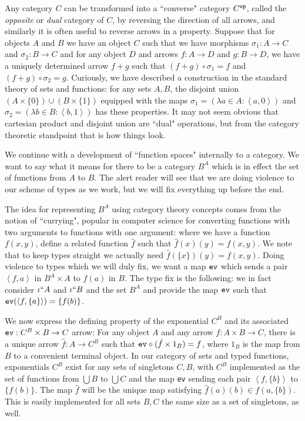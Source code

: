 \documentclass[12pt]{book}
\begin{document}
Any category $C$ can be transformed into a ``converse" category $C^{\tt op}$, called the {\em opposite\/} or {\em dual\/} category of $C$, by reversing the direction of all arrows, and similarly it is often useful to reverse arrows in a property.  Suppose that for objects $A$ and $B$ we have an object $C$ such that we have morphisms $\sigma_1:A \rightarrow C$ and $\sigma_2:B \rightarrow C$ and for any object $D$ and arrows $f:A \rightarrow D$ and $g:B \rightarrow D$, we have a uniquely determined arrow $f+g$ such that
$(f+g) \circ \sigma_1=f$ and $(f+g) \circ \sigma_2=g$.  Curiously, we have described a construction in the standard theory of sets and functions:
for any sets $A,B$, the disjoint union $(A \times \{0\}) \cup (B \times \{1\})$ equipped with the maps $\sigma_1 = (\lambda a \in A:\left<a,0\right>)$
and  $\sigma_2 = (\lambda b \in B:\left<b,1\right>)$ has these properties.  It may not seem obvious that cartesian product and disjoint union are ``dual" operations, but from the category theoretic standpoint that is how things look.

We continue with a development of ``function spaces" internally to a category.  We want to say what it means for there to be a category $B^A$ which
is in effect the set of functions from $A$ to $B$.  The alert reader will see that we are doing violence to our scheme of types as we work, but we will fix everything up before the end.

The idea for representing $B^A$ using category theory concepts comes from the notion of ``currying", popular in computer science for converting
functions with two arguments to functions with one argument:  where we have a function $f(x,y)$, define a related function $\hat{f}$ such that
$\hat{f}(x)(y)=f(x,y)$.  We note that to keep types straight we actually need $\hat{f}(\{x\})(y)=f(x,y)$.   Doing violence to types which we will duly fix, we want a map ${\tt ev}$ which sends a pair $\left<f,a\right>$ in $B^A \times A$ to $f(a)$ in $B$.  The type fix is the following:  we in fact
consider $\iota``A$ and $\iota``B$ and the set $B^A$ and  provide the map ${\tt ev}$ such that ${\tt ev}(\left<f,\{a\}\right>) = \{f(b)\}$.

We now express the defining property of the exponential $C^B$ and its associated ${\tt ev}:C^B \times B \rightarrow C$ arrow:  For any object $A$ and any arrow $f:A \times B \rightarrow C$, there is a unique arrow $\hat{f}: A \rightarrow C^B$ such that ${\tt ev} \circ (\hat{f} \times 1_B) = f$, where $1_B$ is the map from $B$ to a convenient terminal object.  In our category of sets and typed functions, exponentials $C^B$ exist for any sets of singletons $C,B$, with $C^B$ implemented as the set of functions from $\bigcup B$ to $\bigcup C$ and the map {\tt ev} sending each pair $\left<f,\{b\}\right>$ to $\{f(b)\}$.  The map $\hat{f}$ will be the unique map satisfying $\hat{f}(a) (b)  \in f(a,\{b\})$.  This is easily implemented for all sets  $B,C$ the same size as a set of singletons, as well.
\end{document}
